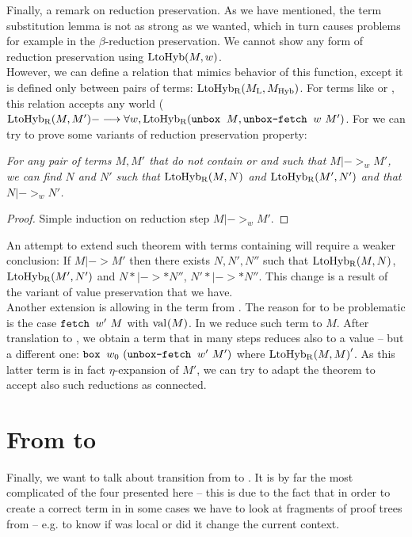 Finally, a remark on reduction preservation. As we have mentioned, the term substitution lemma is not as strong as we wanted, which in turn causes problems for example in the $\beta$-reduction preservation. We cannot show any form of reduction preservation using $\mbox{$\operatorname{LtoHyb}({M}, {w})$}$.\\
However, we can define a relation that mimics behavior of this function, except it is defined only between pairs of terms: $\mbox{$\operatorname{LtoHyb_R}({M_{\text{L}}}, {M_{\text{Hyb}}})$}$. For terms like \unboxe{} or \heree{}, this relation accepts any world ($\mbox{$\operatorname{LtoHyb_R}({M}, {M'})$} ---> \forall w, \mbox{$\operatorname{LtoHyb_R}({\mbox{$\operatorname{\texttt{unbox}}_{}\ {M}$}}, {\mbox{$\operatorname{\texttt{unbox-fetch}}_{}\ {w}\ {M'}$}})$}$. For  we can try to prove some variants of reduction preservation property:

\begin{theorem}\em
For any pair of terms $M, M'$ that do not contain \fetche{} or \gete{} and such that $M |->_w M'$, we can find $N$ and $N'$ such that $\mbox{$\operatorname{LtoHyb_R}({M}, {N})$}$ and $\mbox{$\operatorname{LtoHyb_R}({M'}, {N'})$}$  and that $N |->_w N'$.
\begin{proof}
Simple induction on reduction step $M |->_w M'$.
\end{proof}
\end{theorem}

An attempt to extend such theorem with terms containing \gete{} will require a weaker conclusion: If $M |->M'$ then there exists $N, N', N''$ such that $\mbox{$\operatorname{LtoHyb_R}({M}, {N})$}$, $\mbox{$\operatorname{LtoHyb_R}({M'}, {N'})$}$ and $ N *|->* N''$, $N' *|->*N''$. This change is a result of the variant of value preservation that we have. \\

Another extension is allowing \fetche{} in the term from \langL{}. The reason for \fetche{} to be problematic is the case $\mbox{$\operatorname{\texttt{fetch}}_{}\ {w'}\ {M}$}$ with $\mbox{$\mathrm{val}_{}{(M)}$}$. 
In \langL{} we reduce such term to $M$. After translation to \langHyb{}, we obtain a term that in many steps reduces also to a value -- but a different one: $\mbox{$\operatorname{\texttt{box}}_{}\ {w_0}\ {(\mbox{$\operatorname{\texttt{unbox-fetch}}_{}\ {w'}\ {M'}$})}$}$ where $\mbox{$\operatorname{LtoHyb_R}({M}, {M})$}'$. As this latter term is in fact $\eta$-expansion of $M'$, we can try to adapt the theorem to accept also such reductions as connected.

\section{From \langLF{} to \langHyb{}}

Finally, we want to talk about transition from \langLF{} to \langHyb{}. It is by far the most complicated of the four presented here -- 
this is due to the fact that in order to create a correct term in \langHyb{} in some cases we have to look at fragments of proof trees from \langLF{} -- e.g. to know if  was local or did it change the current context. \\


